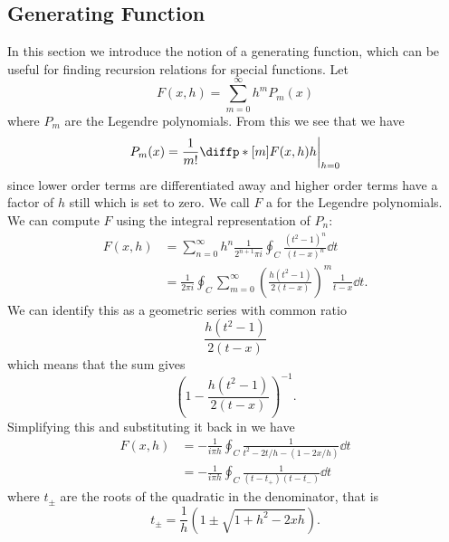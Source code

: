 \documentclass[fleqn]{NotesClass}
\begin{document}
    \subsection{Generating Function}
    In this section we introduce the notion of a generating function, which can be useful for finding recursion relations for special functions.
    Let
    \begin{equation}
        F(x, h) = \sum_{m=0}^{\infty} h^m P_m(x)
    \end{equation}
    where \(P_m\) are the Legendre polynomials.
    From this we see that we have
    \begin{equation}
        P_m(x) = \frac{1}{m!} \diffp*[m]{F(x, h)}{h}\bigg\vert_{h=0}
    \end{equation}
    since lower order terms are differentiated away and higher order terms have a factor of \(h\) still which is set to zero.
    We call \(F\) a  for the Legendre polynomials.
    We can compute \(F\) using the integral representation of \(P_n\):
    \begin{align}
        F(x, h) &= \sum_{n=0}^{\infty} h^n \frac{1}{2^{n+1}\pi i} \oint_C \frac{(t^2 - 1)^n}{(t - x)^n} \dd{t}\\
        &= \frac{1}{2\pi i} \oint_C \sum_{m=0}^{\infty}  \left( \frac{h(t^2 - 1)}{2(t - x)} \right)^m \frac{1}{t - x} \dd{t}.
    \end{align}
    We can identify this as a geometric series with common ratio
    \begin{equation}
        \frac{h(t^2 - 1)}{2(t - x)}
    \end{equation}
    which means that the sum gives
    \begin{equation}
        \left( 1 - \frac{h(t^2 - 1)}{2(t - x)} \right)^{-1}.
    \end{equation}
    Simplifying this and substituting it back in we have
    \begin{align}
        F(x, h) &= -\frac{1}{i\pi h} \oint_C \frac{1}{t^2 - 2t/h - (1 - 2x/h)} \dd{t}\\
        &= -\frac{1}{i\pi h} \oint_C \frac{1}{(t - t_+)(t - t_-)} \dd{t}
    \end{align}
    where \(t_{\pm}\) are the roots of the quadratic in the denominator, that is
    \begin{equation}
        t_{\pm} = \frac{1}{h}\left( 1 \pm \sqrt{1 + h^2 - 2xh} \right).
    \end{equation}
\end{document}
